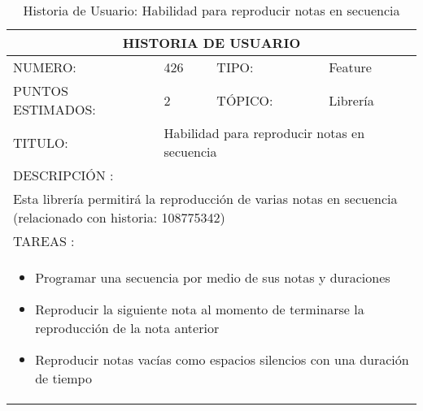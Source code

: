 \begin{table}[h]
\centering
\renewcommand{\arraystretch}{1.4}
\begin{tabular}{|*{4}{l|}}
\hline
\multicolumn{4}{|c|}{HISTORIA DE USUARIO} \\ \hline
NUMERO: & 426 & TIPO: & Feature \\ \hline
PUNTOS ESTIMADOS: & 2 & TÓPICO: & Librería \\ \hline
TITULO: & \multicolumn{3}{|p{7.2cm}|}{Habilidad para reproducir notas en secuencia} \\ \hline
\multicolumn{4}{|l|}{DESCRIPCIÓN : } \\ \hline
\multicolumn{4}{|p{11cm}|}{Esta librería permitirá la reproducción de varias notas en secuencia (relacionado con historia: 108775342)} \\ \hline
\multicolumn{4}{|l|}{TAREAS : } \\ \hline
\multicolumn{4}{|p{11cm}|}{
\begin{minipage}[t]{\hsize}
  \begin{itemize}
    \item Programar una secuencia por medio de sus notas y duraciones
    \item Reproducir la siguiente nota al momento de terminarse la reproducción de la nota anterior
    \item Reproducir notas vacías como espacios silencios con una duración de tiempo
  \end{itemize}
\end{minipage}
} \\ \hline
\end{tabular}
\caption{Historia de Usuario: Habilidad para reproducir notas en secuencia}
\label{tab:Primero}
\end{table}


